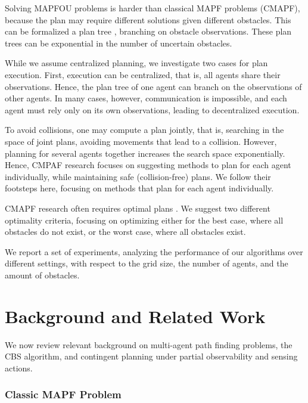 \documentclass[letterpaper]{article} %
\begin{document}
Solving MAPFOU problems is harder than classical MAPF problems (CMAPF), because the plan may require different solutions given different obstacles. This can be formalized a  plan tree \cite{hoffmann2005contingent}, branching on obstacle observations. These plan trees can be exponential in the number of uncertain obstacles.

While we assume centralized planning, we investigate two cases for plan execution. First, execution can be centralized, that is, all agents share their observations. Hence, the plan tree of one agent can branch on the observations of other agents. In many cases, however, communication is impossible, and each agent must rely only on its own observations, leading to decentralized execution.

To avoid collisions, one may compute a plan jointly, that is, searching in the space of joint plans, avoiding movements that lead to a collision. However, planning for several agents together increases the search space exponentially. Hence, CMPAF research focuses on suggesting methods to plan for each agent individually, while maintaining safe (collision-free) plans. We follow their footsteps here, focusing on methods that plan for each agent individually.

CMAPF research often requires optimal plans \cite{stern2019multi}. We suggest two different optimality criteria, focusing on optimizing either for the best case, where all obstacles do not exist, or the worst case, where all obstacles exist.

We report a set of experiments, analyzing the performance of our algorithms over different settings, with respect to the grid size, the number of agents, and the amount of obstacles.





\section{Background and Related Work}

We now review relevant background on multi-agent path finding problems, the CBS algorithm, and contingent planning under partial observability and sensing actions.




\subsubsection{Classic MAPF Problem}
\end{document}
